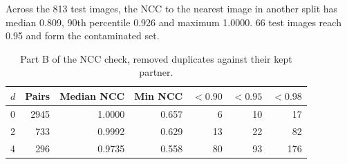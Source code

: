 \begin{table}[H]
\centering\scriptsize
\caption{Part A of the NCC check, curated pairs at or above each threshold.}\label{tab:s_ncc}
\end{table}

Across the 813 test images, the NCC to the nearest image in another split has median 0.809, 90th percentile 0.926 and maximum 1.0000. 66 test images reach 0.95 and form the contaminated set.

\begin{table}[H]
\centering\footnotesize
\caption{Part B of the NCC check, removed duplicates against their kept partner.}\label{tab:s_ncc_b}
{\begin{tabular}{lrrrrrr}
\toprule
$d$ & Pairs & Median NCC & Min NCC & $<0.90$ & $<0.95$ & $<0.98$ \\
\midrule
0 & 2945 & 1.0000 & 0.657 & 6 & 10 & 17 \\
2 & 733 & 0.9992 & 0.629 & 13 & 22 & 82 \\
4 & 296 & 0.9735 & 0.558 & 80 & 93 & 176 \\
\bottomrule
\end{tabular}}
\end{table}


